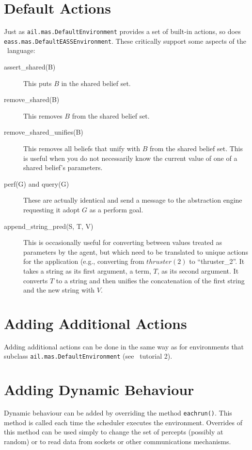 \documentclass[a4]{article}
\begin{document}
\section{Default Actions}
Just as \texttt{ail.mas.DefaultEnvironment} provides a set of built-in actions, so does \texttt{eass.mas.DefaultEASSEnvironment}.  These critically support some aspects of the \eass\ language:

\begin{description}
\item[assert\_shared(B)] This puts $B$ in the shared belief set.
\item[remove\_shared(B)] This removes $B$ from the shared belief set.
\item[remove\_shared\_unifies(B)] This removes all beliefs that unify with $B$ from the shared belief set.  This is useful when you do not necessarily know the current value of one of a shared belief's parameters.
\item[perf(G) and query(G)] These are actually identical and send a message to the abstraction engine requesting it adopt $G$ as a perform goal.
\item[append\_string\_pred(S, T, V)] This is occasionally useful for converting between values treated as parameters by the agent, but which need to be translated to unique actions for the application (e.g., converting from $thruster(2)$ to ``thruster\_2''.  It takes a string as its first argument, a term, $T$, as its second argument.  It converts $T$ to a string and then unifies the concatenation of the first string and the new string with $V$.
\end{description}

\section{Adding Additional Actions}
Adding additional actions can be done in the same way as for environments that subclass \texttt{ail.mas.DefaultEnvironment} (see \ail\ tutorial 2).

\section{Adding Dynamic Behaviour}

Dynamic behaviour can be added by overriding the method \texttt{eachrun()}.  This method is called each time the scheduler executes the environment.  Overrides of this method can be used simply to change the set of percepts (possibly at random) or to read data from sockets or other communications mechanisms.
\end{document}
